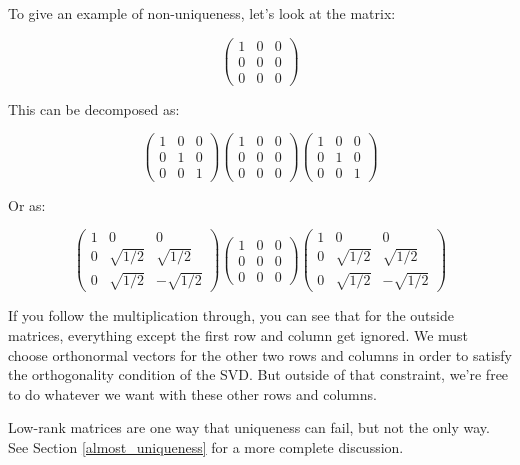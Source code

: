\documentclass{amsbook}
\begin{document}
\begin{tcolorbox}[title=Example,colback=blue!5]
To give an example of non-uniqueness, let's look at the matrix:

$$
\left(\begin{array}{ccc}1&0&0\\0&0&0\\0&0&0\end{array}\right)
$$

This can be decomposed as:

$$
\left(\begin{array}{ccc}1&0&0\\0&1&0\\0&0&1\end{array}\right)
\left(\begin{array}{ccc}1&0&0\\0&0&0\\0&0&0\end{array}\right)
\left(\begin{array}{ccc}1&0&0\\0&1&0\\0&0&1\end{array}\right)
$$

Or as:

$$
\left(\begin{array}{ccc}1&0&0\\0&\sqrt{1/2}&\sqrt{1/2}\\0&\sqrt{1/2}&-\sqrt{1/2}\end{array}\right)
\left(\begin{array}{ccc}1&0&0\\0&0&0\\0&0&0\end{array}\right)
\left(\begin{array}{ccc}1&0&0\\0&\sqrt{1/2}&\sqrt{1/2}\\0&\sqrt{1/2}&-\sqrt{1/2}\end{array}\right)
$$

If you follow the multiplication through, you can see that for the outside matrices, everything except the first row and column get ignored.  We must choose orthonormal vectors for the other two rows and columns in order to satisfy the orthogonality condition of the SVD.  But outside of that constraint, we're free to do whatever we want with these other rows and columns.

\newline

Low-rank matrices are one way that uniqueness can fail, but not the only way.  See Section \ref{almost_uniqueness} for a more complete discussion.
\end{tcolorbox}
\end{document}
